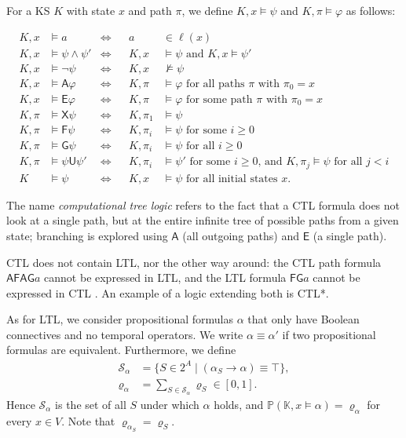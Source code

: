 \documentclass[runngingheads]{llncs}
\begin{document}
For a KS $K$ with state $x$ and path $\pi$, we define $K,x \models \psi$ and $K,\pi \models \varphi$ as follows:

\begin{align*}
K,x &\models a &\Leftrightarrow&& a &\in \ell(x) \\
K,x &\models \psi \wedge \psi' &\Leftrightarrow&& K,x &\models \psi \textrm{ and } K,x \models \psi'\\
K,x &\models \neg \psi &\Leftrightarrow&& K,x &\not\models \psi\\
K,x &\models \mathsf{A}\varphi &\Leftrightarrow&& K,\pi &\models \varphi \textrm{ for all paths $\pi$ with $\pi_0 = x$}\\
K,x &\models \mathsf{E}\varphi &\Leftrightarrow&& K,\pi &\models \varphi \textrm{ for some path $\pi$ with $\pi_0 = x$}\\
K,\pi &\models \mathsf{X}\psi &\Leftrightarrow&& K,\pi_1 &\models \psi \\
K,\pi &\models \mathsf{F}\psi &\Leftrightarrow&& K,\pi_i &\models \psi \textrm{ for some $i \geq 0$}\\
K,\pi &\models \mathsf{G}\psi &\Leftrightarrow&& K,\pi_i &\models \psi \textrm{ for all $i \geq 0$}\\
K,\pi &\models \psi \mathsf{U}\psi' &\Leftrightarrow&& K,\pi_i &\models \psi' \textrm{ for some $i \geq 0$, and } K,\pi_{j} \models \psi \textrm{ for all $j < i$}\\
K &\models \psi & \Leftrightarrow&& K,x &\models \psi \textrm{ for all initial states $x$}.
\end{align*}

The name \emph{computational tree logic} refers to the fact that a CTL formula does not look at a single path, but at the entire infinite tree of possible paths from a given state; branching is explored using $\mathsf{A}$ (all outgoing paths) and $\mathsf{E}$ (a single path).

CTL does not contain LTL, nor the other way around: the CTL path formula $\mathsf{AFAG}a$ cannot be expressed in LTL, and the LTL formula $\mathsf{FG}a$ cannot be expressed in CTL \cite{baier2008principles}. An example of a logic extending both is CTL*.

As for LTL, we consider propositional formulas $\alpha$ that only have Boolean connectives and no temporal operators. We write $\alpha \equiv \alpha'$ if two propositional formulas are equivalent. Furthermore,  we define 
\begin{align}
\mathcal{S}_{\alpha} &= \{S \in 2^A \mid (\alpha_S \rightarrow \alpha) \equiv \top\}, \label{eq:Salpha}\\
\varrho_{\alpha} &= \sum_{S \in \mathcal{S}_{\alpha}} \varrho_S \in [0,1]. \nonumber
\end{align}
Hence $\mathcal{S}_{\alpha}$ is the set of all $S$ under which $\alpha$ holds, and $\mathbb{P}(\mathbb{K},x \models \alpha) = \varrho_{\alpha}$ for every $x \in V$. Note that $\varrho_{\alpha_S} = \varrho_S$. 
\end{document}

